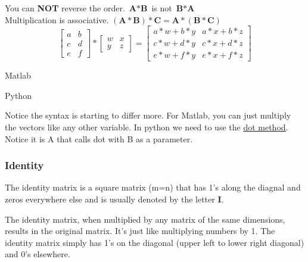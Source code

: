 You can \textbf{NOT} reverse the order.  $\textbf{A}*\textbf{B}$ is not $\textbf{B}*\textbf{A}$\\
Multiplication is associative.  $(\textbf{A}*\textbf{B})*\textbf{C} = \textbf{A}*(\textbf{B}*\textbf{C})$\\

\begin{equation}
  \left[
    \begin{matrix}
      a & b \\
      c & d \\
      e & f
    \end{matrix}
    \right] *
  \left[
    \begin{matrix}
      w & x \\
      y & z
    \end{matrix}
    \right]=
  \left[
    \begin{matrix}
      a*w + b*y  & a*x + b*z\\
      c*w + d*y  & c*x + d*z\\
      e*w + f*y  & e*x + f*z
    \end{matrix}
    \right]
  \label{eqn:MatrixMatrixMultiplication}
\end{equation}

\begin{multicols}{2}
  Matlab\\
  \columnbreak

  Python\\
  
\end{multicols}

Notice the syntax is starting to differ more.  For Matlab, you can just multiply the vectors like any other variable.  In python we need to use the \underline{\href{https://docs.scipy.org/doc/numpy/reference/generated/numpy.dot.html}{dot method}}.  Notice it is A that calls dot with B as a parameter.

\subsubsection{Identity}

The identity matrix is a square matrix (m=n) that has 1's along the diagnal and zeros everywhere else and is usually denoted by the letter \textbf{I}.

The identity matrix, when multiplied by any matrix of the same dimensions, results in the original matrix. It's just like multiplying numbers by 1. The identity matrix simply has 1's on the diagonal (upper left to lower right diagonal) and 0's elsewhere.\\


